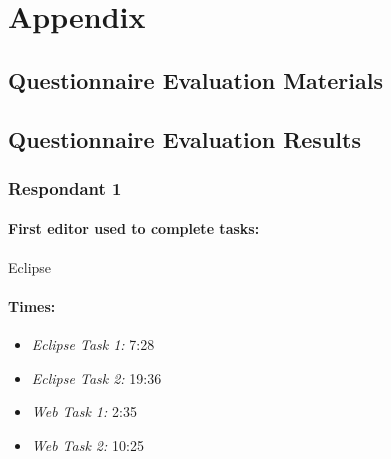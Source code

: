 \documentclass{report}
\begin{document}
\chapter{Appendix}
\section{Questionnaire Evaluation Materials}










\section{Questionnaire Evaluation Results}

\subsection{Respondant 1}
\subsubsection*{First editor used to complete tasks:} Eclipse
\subsubsection*{Times:}
\begin{itemize}
\item \emph{Eclipse Task 1:} 7:28
\item \emph{Eclipse Task 2:} 19:36
\item \emph{Web Task 1:} 2:35
\item \emph{Web Task 2:} 10:25
\end{itemize}
\end{document}
